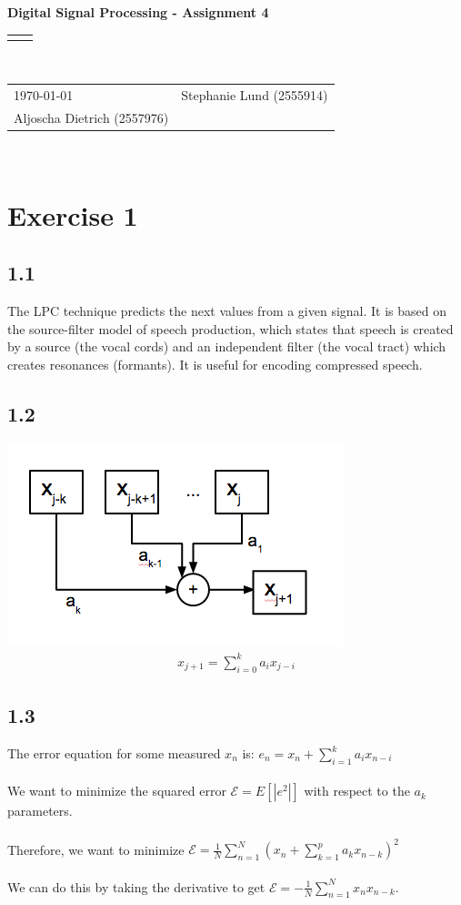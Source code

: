 \documentclass[12pt]{article}
\renewcommand{\title}[1]{\textbf{#1}\\}
\renewcommand{\line}{\begin{tabularx}{\textwidth}{X>{\raggedleft}X}\hline\\\end{tabularx}\\[-0.5cm]}
\newcommand{\leftright}[2]{\begin{tabularx}{\textwidth}{X>{\raggedleft}X}#1%
& #2\\\end{tabularx}\\[-0.5cm]}
\begin{document}
\title{Digital Signal Processing - Assignment 4}
\line
\leftright{\today}{Stephanie Lund (2555914)\\Aljoscha Dietrich (2557976)} %

\section*{Exercise 1}

\subsection*{1.1}
The LPC technique predicts the next values from a given signal. It is based on the source-filter model of speech production, which states that speech is created by a source (the vocal cords) and an independent filter (the vocal tract) which creates resonances (formants). It is useful for encoding compressed speech.

\subsection*{1.2}
\includegraphics[scale=0.65]{hw4-2.png}
\begin{align*}
	x_{j+1} = \sum_{i=0}^{k} a_i x_{j-i}
\end{align*}

\subsection*{1.3}
The error equation for some measured $x_n$ is: $e_n = x_n + \sum_{i=1}^k a_i x_{n-i}$\\\\
We want to minimize the squared error $\mathcal{E} = E[ |e^2| ]$ with respect to the $a_k$ parameters.\\\\
Therefore, we want to minimize $\mathcal{E} = \frac{1}{N} \sum_{n=1}^N (x_n + \sum_{k=1}^p a_k x_{n-k})^2$\\\\
We can do this by taking the derivative to get $\mathcal{E} = - \frac{1}{N} \sum_{n=1}^N x_n x_{n-k}$.
\end{document}
